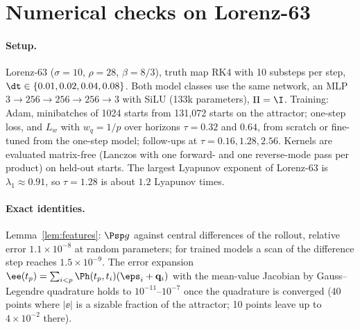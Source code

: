 
\section{Numerical checks on Lorenz-63}\label{sec:numerics}

\paragraph{Setup.}
Lorenz-63 ($\sigma=10$, $\rho=28$, $\beta=8/3$), truth map RK4 with 10 substeps per step, $\dt\in\{0.01,0.02,0.04,0.08\}$.
Both model classes use the same network, an MLP $3\to256\to256\to256\to3$ with SiLU (133k parameters), $\Pi = \I$.
Training: Adam, minibatches of 1024 starts from 131{,}072 starts on the attractor; one-step loss, and $L_w$ with $w_q = 1/p$ over horizons $\tau = 0.32$ and $0.64$, from scratch or fine-tuned from the one-step model; follow-ups at $\tau = 0.16, 1.28, 2.56$.
Kernels are evaluated matrix-free (Lanczos with one forward- and one reverse-mode pass per product) on held-out starts.
The largest Lyapunov exponent of Lorenz-63 is $\lambda_1\approx0.91$, so $\tau = 1.28$ is about $1.2$ Lyapunov times.

\paragraph{Exact identities.}
Lemma~\ref{lem:features}: $\Psp g$ against central differences of the rollout, relative error $1.1\times10^{-8}$ at random parameters; for trained models a scan of the difference step reaches $1.5\times10^{-9}$.
The error expansion $\ee(t_p) = \sum_{i<p}\Ph(t_p,t_i)(\eps_i + \mathbf q_i)$ with the mean-value Jacobian by Gauss--Legendre quadrature holds to $10^{-11}$--$10^{-7}$ once the quadrature is converged (40 points where $|\ee|$ is a sizable fraction of the attractor; 10 points leave up to $4\times10^{-2}$ there).

